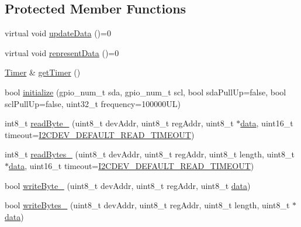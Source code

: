 \subsection*{Protected Member Functions}
\begin{DoxyCompactItemize}
\item 
virtual void \mbox{\hyperlink{classperif_1_1Perif_a7c9b9c1af5300dc5c007f9559fefbffe}{update\+Data}} ()=0
\item 
virtual void \mbox{\hyperlink{classperif_1_1Perif_a556c780e9e4623aa6b7c3d167ef23e6b}{represent\+Data}} ()=0
\item 
\mbox{\hyperlink{classTimer}{Timer}} \& \mbox{\hyperlink{classperif_1_1Perif_a29c48598a861d85256c30e28af67f864}{get\+Timer}} ()
\item 
bool \mbox{\hyperlink{classI2Cdev_a794a92b925f7970399f8b148caa5eef8}{initialize}} (gpio\+\_\+num\+\_\+t sda, gpio\+\_\+num\+\_\+t scl, bool sda\+Pull\+Up=false, bool scl\+Pull\+Up=false, uint32\+\_\+t frequency=100000\+U\+L)
\item 
int8\+\_\+t \mbox{\hyperlink{classI2Cdev_a74447cfadf4d5054ba29b726afcdecd0}{read\+Byte\+\_\+}} (uint8\+\_\+t dev\+Addr, uint8\+\_\+t reg\+Addr, uint8\+\_\+t $\ast$\mbox{\hyperlink{classperif_1_1PerifBase_a1a3afaa535fda17e9f97123fffe78765}{data}}, uint16\+\_\+t timeout=\mbox{\hyperlink{I2Cdev_8h_ad9726bb02451bb8f59d3d2729e4cd20e}{I2\+C\+D\+E\+V\+\_\+\+D\+E\+F\+A\+U\+L\+T\+\_\+\+R\+E\+A\+D\+\_\+\+T\+I\+M\+E\+O\+UT}})
\item 
int8\+\_\+t \mbox{\hyperlink{classI2Cdev_a3fae6b1ae9e9398b682eb7bdf6b43561}{read\+Bytes\+\_\+}} (uint8\+\_\+t dev\+Addr, uint8\+\_\+t reg\+Addr, uint8\+\_\+t length, uint8\+\_\+t $\ast$\mbox{\hyperlink{classperif_1_1PerifBase_a1a3afaa535fda17e9f97123fffe78765}{data}}, uint16\+\_\+t timeout=\mbox{\hyperlink{I2Cdev_8h_ad9726bb02451bb8f59d3d2729e4cd20e}{I2\+C\+D\+E\+V\+\_\+\+D\+E\+F\+A\+U\+L\+T\+\_\+\+R\+E\+A\+D\+\_\+\+T\+I\+M\+E\+O\+UT}})
\item 
bool \mbox{\hyperlink{classI2Cdev_a97645c5d6a3e295bb72b9ee5ab810d12}{write\+Byte\+\_\+}} (uint8\+\_\+t dev\+Addr, uint8\+\_\+t reg\+Addr, uint8\+\_\+t \mbox{\hyperlink{classperif_1_1PerifBase_a1a3afaa535fda17e9f97123fffe78765}{data}})
\item 
bool \mbox{\hyperlink{classI2Cdev_a2f9176cd44c3163ca3929ac1c2ff601b}{write\+Bytes\+\_\+}} (uint8\+\_\+t dev\+Addr, uint8\+\_\+t reg\+Addr, uint8\+\_\+t length, uint8\+\_\+t $\ast$\mbox{\hyperlink{classperif_1_1PerifBase_a1a3afaa535fda17e9f97123fffe78765}{data}})
\item 

\end{DoxyCompactItemize}
